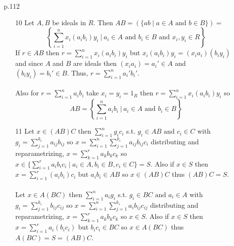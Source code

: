 \documentclass[12pt]{extarticle}
\begin{document}
\begin{enumerate}
\begin{enumerate}
\end{enumerate}

\item[p.112]
\begin{enumerate}
\item[10] Let $A, B$ be ideals in $R$. Then $AB = \left(\{ ab \mid a \in A \text{ and } b \in B \}\right) = $ \[ \left\{\sum_{i = 1}^n x_i (a_ib_i) y_i \: \Big| \: a_i \in A \text{ and } b_i \in B \text{ and } x_i,y_i \in R \right\} \] If $r \in AB$ then $r = \sum_{i = 1}^n x_i(a_i b_i)y_i$ but $x_i (a_i b_i) y_i = (x_i a_i) (b_i y_i)$ and since $A$ and $B$ are ideals then $(x_i a_i) = a_i' \in A$ and $(b_i y_i) = b_i' \in B$. Thus, $r = \sum_{i = 1}^n a_i' b_i'$. \\ \\ Also for $r = \sum_{i = 1}^n a_i b_i$ take $x_i = y_i = 1_R$ then $r = \sum_{i = 1}^n x_i(a_i b_i)y_i$ so \[AB = \left\{\sum_{i = 1}^n a_i b_i \: \Big| \: a_i \in A \text{ and } b_i \in B \right\}\]

\item[11] Let $x \in (AB)C$ then $\sum_{i = 1}^n g_i c_i$ s.t. $g_i \in AB \text{ and } c_i \in C$ with $g_i = \sum_{j = 1}^{k_i} a_{ij} b_{ij}$ so $x = \sum_{i = 1}^n \sum_{j = 1}^{k_i} a_{ij}b_{ij}c_i $ distributing and reparametrizing, $x = \sum_{k = 1}^r a_k b_k c_k$ so $x \in \{ \sum_{i = 1}^r a_i b_i c_i \mid a_i \in A, b_i \in B, c_i \in C\} = S$. Also if $x \in S$ then $x = \sum_{i = 1}^r (a_i b_i) c_i$ but $a_i b_i \in AB$ so $x \in (AB)C$ thus $(AB)C = S$. \\ \\
Let $x \in A(BC)$ then $\sum_{i = 1}^n a_i g_i$ s.t. $g_i \in BC \text{ and } a_i \in A$ with $g_i = \sum_{j = 1}^{k_i} b_{ij} c_{ij}$ so $x = \sum_{i = 1}^n \sum_{j = 1}^{k_i} a_{i}b_{ij}c_{ij} $ distributing and reparametrizing, $x = \sum_{k = 1}^r a_k b_k c_k$ so $x \in S$. Also if $x \in S$ then $x = \sum_{i = 1}^r a_i (b_i c_i)$ but $b_i c_i \in BC$ so $x \in A(BC)$ thus $A(BC) = S = (AB)C$.


\end{enumerate}
\end{enumerate}
\end{document}
